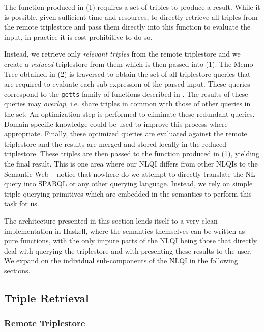 \documentclass[../main.tex]{subfiles}
\begin{document}
\begin{refsection}
\noindent The function produced in (1) requires a set of triples to produce a result.  While it is possible, given sufficient time and resources, to directly retrieve all triples from the remote triplestore and pass them directly into this function to evaluate the input, in practice it is cost prohibitive to do so.

Instead, we retrieve only {\em relevant triples} \cite{peelar2016accommodating} from the remote triplestore and we create a {\em reduced} triplestore from them which is then passed into (1). The Memo Tree obtained in (2) is traversed to obtain the set of all triplestore queries that are required to evaluate each sub-expression of the parsed input.  These queries correspond to the \texttt{getts} family of functions described in . The results of these queries may \textit{overlap}, i.e. share triples in common with those of other queries in the set. An optimization step is performed to eliminate these redundant queries. Domain specific knowledge could be used to improve this process where appropriate.
Finally, these optimized queries are evaluated against the remote triplestore and the results are merged and stored locally in the reduced triplestore.  These triples are then passed to the function produced in (1), yielding the final result.
This is one area where our NLQI differs from other NLQIs to the Semantic Web -- notice that nowhere do we attempt to directly translate the NL query into SPARQL or any other querying language.  Instead, we rely on simple triple querying primitives which are embedded in the semantics to perform this task for us.

The architecture presented in this section lends itself to a very clean implementation in Haskell, where the semantics themselves can be written as pure functions, with the only impure parts of the NLQI being those that directly deal with querying the triplestore and with presenting these results to the user. We expand on the individual sub-components of the NLQI in the following sections.

\subsection{Triple Retrieval}
\label{webist2019journal:tripleretrieval}

\subsubsection{Remote Triplestore}
\label{webist2019journal:getts}


\end{refsection}
\end{document}
